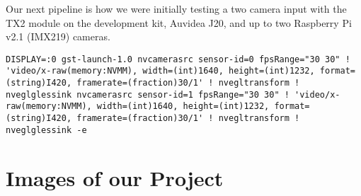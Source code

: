 \documentclass[letterpaper,10pt,serif,draftclsnofoot,onecolumn,compsoc,titlepage]{IEEEtran}
\begin{document}
Our next pipeline is how we were initially testing a two camera input with the TX2 module 
on the development kit, Auvidea J20, and up to two Raspberry Pi v2.1 (IMX219) cameras. \\

\begin{lstlisting}
DISPLAY=:0 gst-launch-1.0 nvcamerasrc sensor-id=0 fpsRange="30 30" ! 'video/x-raw(memory:NVMM), width=(int)1640, height=(int)1232, format=(string)I420, framerate=(fraction)30/1' ! nvegltransform ! nveglglessink nvcamerasrc sensor-id=1 fpsRange="30 30" ! 'video/x-raw(memory:NVMM), width=(int)1640, height=(int)1232, format=(string)I420, framerate=(fraction)30/1' ! nvegltransform ! nveglglessink -e
\end{lstlisting}
\cite{TwoCamPipe}


\section{Images of our Project}



\nocite{*}
\newpage


\end{document}
